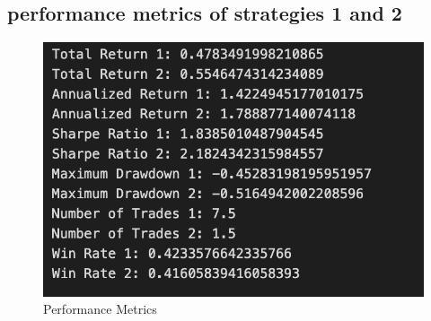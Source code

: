 \documentclass[12pt,a4paper]{article}
\begin{document}
\subsection{ performance metrics of strategies 1 and 2}
\begin{figure}[h]
        \centering
        \includegraphics[scale=0.50]{Adj_SS/AdjPerfomrance.png}
              \caption{Performance Metrics}
    \end{figure}
\end{document}
